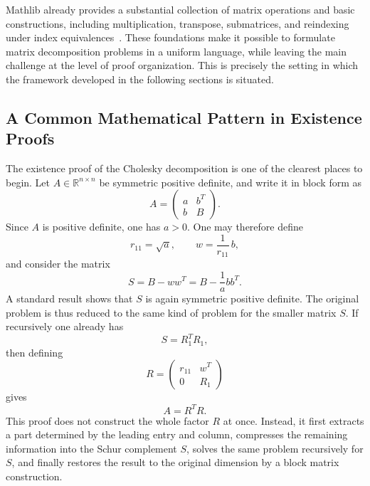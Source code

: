 \documentclass[pdflatex,sn-mathphys-num]{sn-jnl}%
\theoremstyle{thmstyleone}%
\theoremstyle{thmstyletwo}%
\theoremstyle{thmstylethree}%
\begin{document}
Mathlib already provides a substantial collection of matrix operations and basic constructions, including multiplication, transpose, submatrices, and reindexing under index equivalences~\cite{mathlib2020,avigad2020mathematics}. These foundations make it possible to formulate matrix decomposition problems in a uniform language, while leaving the main challenge at the level of proof organization. This is precisely the setting in which the framework developed in the following sections is situated.

\subsection{A Common Mathematical Pattern in Existence Proofs}
The existence proof of the Cholesky decomposition is one of the clearest places to begin. Let \(A \in \mathbb{R}^{n \times n}\) be symmetric positive definite, and write it in block form as
\[
A=
\begin{pmatrix}
a & b^{T}\\
b & B
\end{pmatrix}.
\]
Since \(A\) is positive definite, one has \(a>0\). One may therefore define
\[
r_{11}=\sqrt a,
\qquad
w=\frac{1}{r_{11}}\,b,
\]
and consider the matrix
\[
S=B-ww^{T}=B-\frac{1}{a}bb^{T}.
\]
A standard result shows that \(S\) is again symmetric positive definite. The original problem is thus reduced to the same kind of problem for the smaller matrix \(S\). If recursively one already has
\[
S=R_1^{T}R_1,
\]
then defining
\[
R=
\begin{pmatrix}
r_{11} & w^{T}\\
0 & R_1
\end{pmatrix}
\]
gives
\[
A=R^{T}R.
\]
This proof does not construct the whole factor \(R\) at once. Instead, it first extracts a part determined by the leading entry and column, compresses the remaining information into the Schur complement \(S\), solves the same problem recursively for \(S\), and finally restores the result to the original dimension by a block matrix construction.
\end{document}
